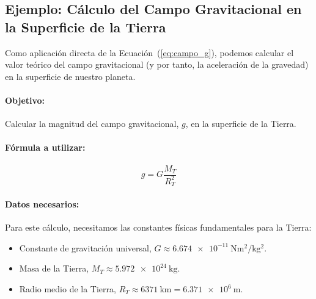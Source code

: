 \documentclass[11pt,a4paper]{book}
\begin{document}




\subsection{Ejemplo: Cálculo del Campo Gravitacional en la Superficie de la Tierra}

Como aplicación directa de la Ecuación~(\ref{eq:campo_g}), podemos calcular el valor teórico del campo gravitacional (y por tanto, la aceleración de la gravedad) en la superficie de nuestro planeta.

\paragraph{Objetivo:}
Calcular la magnitud del campo gravitacional, $g$, en la superficie de la Tierra.

\paragraph{Fórmula a utilizar:}
\[ g = G \frac{M_T}{R_T^2} \]

\paragraph{Datos necesarios:}
Para este cálculo, necesitamos las constantes físicas fundamentales para la Tierra:
\begin{itemize}
    \item Constante de gravitación universal, $G \approx \SI{6.674e-11}{\newton\meter\squared\per\kilo\gram\squared}$.
    \item Masa de la Tierra, $M_T \approx \SI{5.972e24}{\kilo\gram}$.
    \item Radio medio de la Tierra, $R_T \approx \SI{6371}{\kilo\meter} = \SI{6.371e6}{\meter}$.
\end{itemize}
\end{document}
